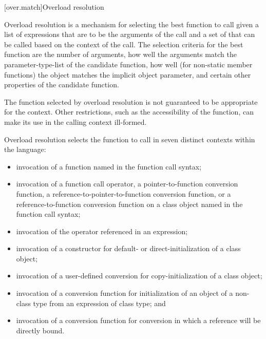 [over.match]{Overload resolution}%
%
%

\pnum
Overload resolution is a mechanism for selecting the best
function to call given a list of expressions that are to be the
arguments of the call and a set of
that can
be called based on the context of the call.
The selection
criteria for the best function are the number of arguments, how
well the arguments match the parameter-type-list of the
candidate function,
how well (for non-static member functions) the object
matches the implicit object parameter,
and certain other properties of the candidate function.
\begin{note}
The function selected by overload resolution is not
guaranteed to be appropriate for the context.
Other restrictions,
such as the accessibility of the function, can make its use in
the calling context ill-formed.
\end{note}

\pnum
{}%
Overload resolution selects the function to call in seven distinct
contexts within the language:

\begin{itemize}
\item
invocation of a function named in the function call syntax;
\item
invocation of a function call operator, a pointer-to-function
conversion function, a reference-to-pointer-to-function conversion
function, or a reference-to-function
conversion function on a class object named in the function
call syntax;
\item
invocation of the operator referenced in an expression;
\item
invocation of a constructor for default- or direct-initialization
of a class object;
\item
invocation of a user-defined conversion for
copy-initialization of a class object;
\item
invocation of a conversion function for initialization of an object of a
non-class type from an expression of class type; and
\item
invocation of a conversion function for conversion
in which a reference
will be directly bound.
\end{itemize}

